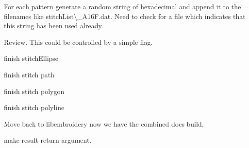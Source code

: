 \begin{DoxyRefList}
\label{todo__todo000389}%
%
For each pattern generate a random string of hexadecimal and append it to the filenames like {\ttfamily stitch\+List\textbackslash{}\+\_\+\+A16\+F.\+dat}. Need to check for a file which indicates that this string has been used already. 
\item[Member \mbox{\hyperlink{geometry_8c_ae6461f57f08ce5992c70fa9897988644}{emb\+Geometry\+\_\+vulcanize}} (Emb\+Geometry $\ast$obj)]\label{todo__todo000412}%
%
Review. This could be controlled by a simple flag.  
\item[Member \mbox{\hyperlink{fill_8c_a63bc84e4406e59c092a2e076afedf930}{emb\+Pattern\+\_\+stitch\+Ellipse}} (Emb\+Pattern $\ast$p, Emb\+Ellipse ellipse, int thread\+\_\+index, int style)]\label{todo__todo000398}%
%
finish stitch\+Ellipse  
\item[Member \mbox{\hyperlink{fill_8c_a736fce5df010bbe74ea9ad2857be9bf4}{emb\+Pattern\+\_\+stitch\+Path}} (Emb\+Pattern $\ast$p, Emb\+Path path, int thread\+\_\+index, int style)]\label{todo__todo000399}%
%
finish stitch path  
\item[Member \mbox{\hyperlink{fill_8c_a86f903495c0da7514294200680bd6414}{emb\+Pattern\+\_\+stitch\+Polygon}} (Emb\+Pattern $\ast$p, Emb\+Polygon polygon, int thread\+\_\+index, int style)]\label{todo__todo000400}%
%
finish stitch polygon  
\item[Member \mbox{\hyperlink{fill_8c_a9ae9d5d7dfbb2ab361dc37970b7eb2f2}{emb\+Pattern\+\_\+stitch\+Polyline}} (Emb\+Pattern $\ast$p, Emb\+Polyline polyline, int thread\+\_\+index, int style)]\label{todo__todo000401}%
%
finish stitch polyline  
\item[Page \mbox{\hyperlink{md_extern_libembroidery_src_embroider_cli}{embroider\+\_\+cli}} ]\label{todo__todo000390}%
%
Move back to libembroidery now we have the combined docs build. 
\item[Member \mbox{\hyperlink{vector_8c_a0a4af07bfac410623cf77a35a11550b1}{emb\+Vector\+\_\+multiply}} (Emb\+Vector vector, Emb\+Real magnitude, Emb\+Vector $\ast$result)]\label{todo__todo000423}%
%
make result return argument.  
\item[Member \mbox{\hyperlink{vector_8c_aaad72d90c58592e330de08139aee5077}{emb\+Vector\+\_\+normalize}} (Emb\+Vector vector, Emb\+Vector $\ast$result)]\label{todo__todo000422}%
%

\end{DoxyRefList}
